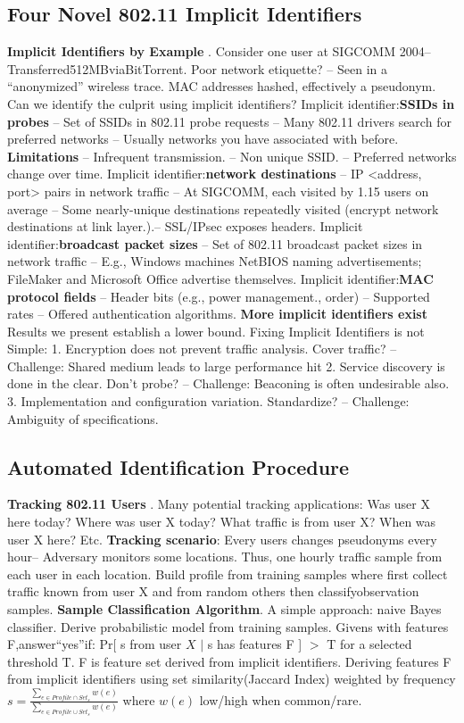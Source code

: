 \documentclass[9pt]{extarticle}
\begin{document}
\begin{multicols}{2}
\subsection{Four Novel 802.11 Implicit Identifiers}
\textbf{Implicit Identifiers by Example}
. Consider one user at SIGCOMM 2004– Transferred512MBviaBitTorrent. Poor network etiquette?
– Seen in a “anonymized” wireless trace. MAC addresses hashed, effectively a pseudonym. Can we identify the culprit using implicit identifiers? Implicit identifier:\textbf{SSIDs in probes} – Set of SSIDs in 802.11 probe requests – Many 802.11 drivers search for preferred networks – Usually networks you have associated with before. \textbf{Limitations} – Infrequent transmission. – Non unique SSID. – Preferred networks change over time. Implicit identifier:\textbf{network destinations} – IP <address, port> pairs in network traffic – At SIGCOMM, each visited by 1.15 users on average – Some nearly-unique destinations repeatedly visited (encrypt network destinations at link layer.).– SSL/IPsec exposes headers. Implicit identifier:\textbf{broadcast packet sizes} – Set of 802.11 broadcast packet sizes in network traffic – E.g., Windows machines NetBIOS naming advertisements; FileMaker and Microsoft Office advertise themselves. Implicit identifier:\textbf{MAC protocol fields}
– Header bits (e.g., power management., order)
– Supported rates
– Offered authentication algorithms. \textbf{More implicit identifiers exist} Results we present establish a lower bound. Fixing Implicit Identifiers is not Simple: 
1. Encryption does not prevent traffic analysis. Cover traffic? – Challenge: Shared medium leads to large performance hit 2. Service discovery is done in the clear. Don’t probe? – Challenge: Beaconing is often undesirable also. 3. Implementation and configuration variation. Standardize? – Challenge: Ambiguity of specifications.

\subsection{Automated Identification Procedure}

\textbf{Tracking 802.11 Users}
. Many potential tracking applications: Was user X here today? Where was user X today? What traffic is from user X? When was user X here? Etc. \textbf{Tracking scenario}: Every users changes pseudonyms every hour– Adversary monitors some locations. Thus, one hourly traffic sample from each user in each location. Build profile from training samples where first collect traffic known from user X and from random others then classifyobservation samples. \textbf{Sample Classification Algorithm}. A simple approach: naive Bayes classifier. Derive probabilistic model from training samples. Givens with features F,answer“yes”if: Pr[ s from user $X$ $|$ s has features F ] $>$ T for a selected threshold T. F is feature set derived from implicit identifiers. Deriving features F from implicit identifiers using set similarity(Jaccard Index) weighted by frequency $s=\frac{\sum_{e\in{Profile\cap{Set_s}}}w(e)}{\sum_{e\in{Profile\cup{Set_s}}}w(e)}$ where $w(e)$ low/high when common/rare.




\end{multicols}
\end{document}
